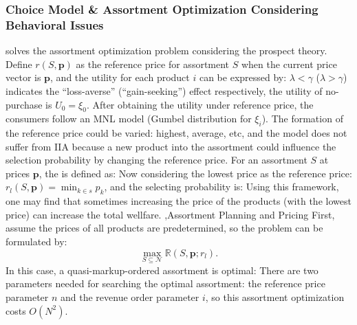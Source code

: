 \documentclass[12pt]{report}
\begin{document}
\subsubsection{Choice Model \& Assortment Optimization Considering Behavioral Issues}
\cite{wang2018prospect} solves the assortment optimization problem considering the prospect theory. 
Define $r(S,\mathbf{p})$ as the reference price for assortment $S$ when the current price vector is $\mathbf{p}$, and the utility for each product $i$ can be expressed by:
$\lambda<\gamma$ ($\lambda>\gamma$) indicates the ``loss-averse'' (``gain-seeking'') effect respectively, the utility of no-purchase is $U_0=\xi_0$. 
After obtaining the utility under reference price, the consumers follow an MNL model (Gumbel distribution for $\xi_i$). 
The formation of the reference price could be varied: highest, average, etc, and the model does not suffer from IIA because a new product into the assortment could influence the selection probability by changing the reference price. 
For an assortment $S$ at prices $\mathbf{p}$, the  is defined as:
Now considering the lowest price as the reference price: $r_l(S,\mathbf{p})=\min_{k\in s}p_k$, and the selecting probability is:
Using this framework, one may find that sometimes increasing the price of the products (with the lowest price) can increase the total wellfare.
\sep{Assortment Planning and Pricing}
First, assume the prices of all products are predetermined, so the problem can be formulated by:
\[
    \max_{S\subseteq\mathcal{N}}\mathbb{R}(S,\mathbf{p};r_l).
\]
In this case, a quasi-markup-ordered assortment is optimal:
There are two parameters needed for searching the optimal assortment: the reference price parameter $n$ and the revenue order parameter $i$, so this assortment optimization costs $O(N^2)$. 
\end{document}
